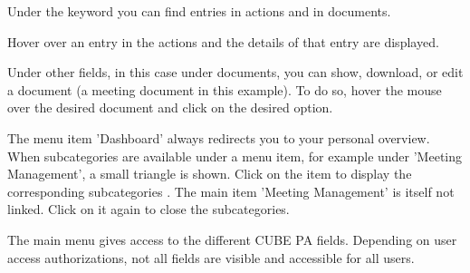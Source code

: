 \begin{compactitem}
	\item Under the keyword you can find entries in actions and in documents.
	\item Hover over an entry in the actions and the details of that entry are displayed.
	\item Under other fields, in this case under documents, you can show, download, or edit a document (a meeting document in this example). To do so, hover the mouse over the desired document and click on the desired option.
\end{compactitem}

\vspace{\baselineskip}

The menu item 'Dashboard'  always redirects you to your personal overview. When subcategories are available under a menu item, for example under 'Meeting Management', a small triangle is shown. Click on the item to display the corresponding subcategories . The main item 'Meeting Management' is itself not linked. Click on it again to close the subcategories.

\vspace{\baselineskip}

The main menu gives access to the different CUBE PA fields. Depending on user access authorizations, not all fields are visible and accessible for all users.

